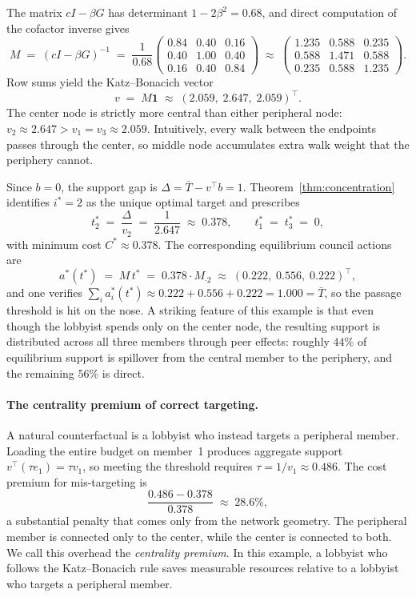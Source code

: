 \documentclass[11pt,letterpaper]{article}
\theoremstyle{plain}
\theoremstyle{definition}
\theoremstyle{remark}
\begin{document}
The matrix $cI - \beta G$ has determinant $1 - 2\beta^2 = 0.68$, and direct computation of the cofactor inverse gives
\[
M \;=\; (cI - \beta G)^{-1} \;=\; \frac{1}{0.68}\begin{pmatrix} 0.84 & 0.40 & 0.16 \\ 0.40 & 1.00 & 0.40 \\ 0.16 & 0.40 & 0.84 \end{pmatrix}
\;\approx\;
\begin{pmatrix} 1.235 & 0.588 & 0.235 \\ 0.588 & 1.471 & 0.588 \\ 0.235 & 0.588 & 1.235 \end{pmatrix}.
\]
Row sums yield the Katz--Bonacich vector
\[
v \;=\; M\mathbf{1} \;\approx\; (2.059,\; 2.647,\; 2.059)^\top.
\]
The center node is strictly more central than either peripheral node: $v_2 \approx 2.647 > v_1 = v_3 \approx 2.059$. Intuitively, every walk between the endpoints passes through the center, so middle node accumulates extra walk weight that the periphery cannot.

Since $b = 0$, the support gap is $\Delta = \bar T - v^\top b = 1$. Theorem~\ref{thm:concentration} identifies $i^* = 2$ as the unique optimal target and prescribes
\[
t^*_2 \;=\; \frac{\Delta}{v_2} \;=\; \frac{1}{2.647} \;\approx\; 0.378, \qquad t^*_1 \;=\; t^*_3 \;=\; 0,
\]
with minimum cost $C^* \approx 0.378$. The corresponding equilibrium council actions are
\[
a^*(t^*) \;=\; M\,t^* \;=\; 0.378 \cdot M_{\cdot 2} \;\approx\; (0.222,\; 0.556,\; 0.222)^\top,
\]
and one verifies $\sum_i a_i^*(t^*) \approx 0.222 + 0.556 + 0.222 = 1.000 = \bar T$, so the passage threshold is hit on the nose. A striking feature of this example is that even though the lobbyist spends only on the center node, the resulting support is distributed across all three members through peer effects: roughly $44\%$ of equilibrium support is spillover from the central member to the periphery, and the remaining $56\%$ is direct.

\paragraph{The centrality premium of correct targeting.} A natural counterfactual is a lobbyist who instead targets a peripheral member. Loading the entire budget on member~1 produces aggregate support $v^\top (\tau e_1) = \tau v_1$, so meeting the threshold requires $\tau = 1/v_1 \approx 0.486$. The cost premium for mis-targeting is
\[
\frac{0.486 - 0.378}{0.378} \;\approx\; 28.6\%,
\]
a substantial penalty that comes only from the network geometry. The peripheral member is connected only to the center, while the center is connected to both. We call this overhead the \emph{centrality premium}. In this example, a lobbyist who follows the Katz--Bonacich rule saves measurable resources relative to a lobbyist who targets a peripheral member.
\end{document}
